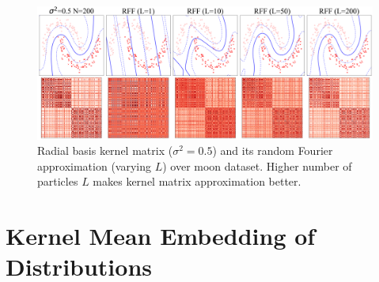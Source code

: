 \documentclass[11pt]{article}
\begin{document}
\begin{center} 
\begin{figure}[h!]
    \includegraphics[width=\textwidth]{assets/rbf_rff_svm.png} 
    \caption{Radial basis kernel matrix ($\sigma^2=0.5$) and its random Fourier approximation (varying $L$) over moon dataset. Higher number of particles $L$ makes kernel matrix approximation better.}
    \label{fig:rbf_rff}
\end{figure}
\end{center} 

\section{Kernel Mean Embedding of Distributions}
\end{document}
